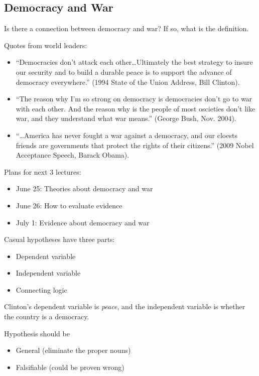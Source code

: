 \documentclass{article}
\begin{document}
\subsection{Democracy and War}

Is there a connection between democracy and war?  If so, what is the definition.

Quotes from world leaders:

\begin{itemize}
  \item ``Democracies don't attack each other\ldots Ultimately the best strategy to insure our security and to build a durable peace is to support the advance of democracy everywhere.'' (1994 State of the Union Address, Bill Clinton).
  \item ``The reason why I'm so strong on democracy is democracies don't go to war with each other.  And the reason why is the people of most oscieties don't like war, and they understand what war means.'' (George Bush, Nov. 2004).
  \item ``\ldots America has never fought a war against a democracy, and our cloests friends are governments that protect the rights of their citizens.'' (2009 Nobel Acceptance Speech, Barack Obama).
\end{itemize}

Plans for next 3 lectures:

\begin{itemize}
  \item June 25: Theories about democracy and war
  \item June 26: How to evaluate evidence
  \item July 1: Evidence about democracy and war
\end{itemize}

Casual hypotheses have three parts:

\begin{itemize}
  \item Dependent variable
  \item Independent variable
  \item Connecting logic
\end{itemize}

Clinton's dependent variable is {\it peace}, and the independent variable is whether the country is a democracy.

Hypothesis should be

\begin{itemize}
  \item General (eliminate the proper nouns)
  \item Falsifiable (could be proven wrong)
\end{itemize}
\end{document}
